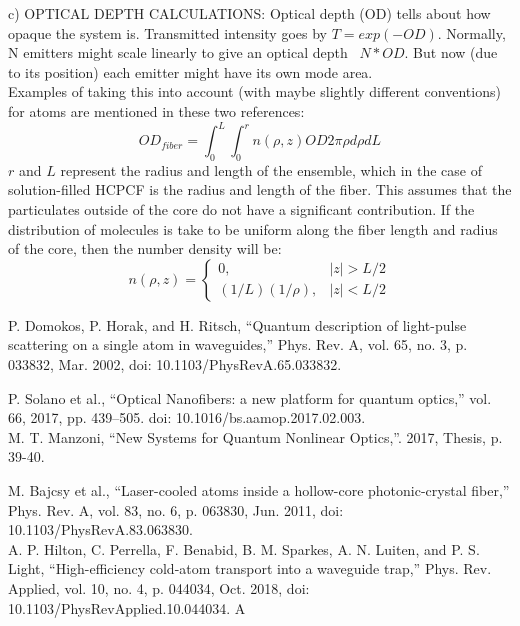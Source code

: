 c) OPTICAL DEPTH CALCULATIONS: Optical depth (OD) tells about how opaque the system is. Transmitted intensity goes by $T = exp(-OD)$. Normally, N emitters might scale linearly to give an optical depth ~$N*OD$. But now (due to its position) each emitter might have its own mode area.\\

Examples of taking this into account (with maybe slightly different conventions) for atoms are mentioned in these two references\cite{bajcsy, hilton}: 
\begin{equation}
	OD_{fiber} = \int^L_0 \int^{r}_0 n(\rho, z) OD 2\pi \rho d\rho dL
\end{equation}
$r$ and $L$ represent the radius and length of the ensemble, which in the case of solution-filled HCPCF is the radius and length of the fiber. This assumes that the particulates outside of the core do not have a significant contribution.  If the distribution of molecules is take to be uniform along the fiber length and radius of the core, then the number density will be: 
\begin{equation}
	n(\rho, z) = \begin{cases}
		0, &|z| > L/2\\
		(1/L) (1/\rho), &|z| < L/2
	\end{cases}
\end{equation}

\begin{thebibliography}{mode}
	 P. Domokos, P. Horak, and H. Ritsch, “Quantum description of light-pulse scattering on a single atom in waveguides,” Phys. Rev. A, vol. 65, no. 3, p. 033832, Mar. 2002, doi: 10.1103/PhysRevA.65.033832.
	
	 P. Solano et al., “Optical Nanofibers: a new platform for quantum optics,” vol. 66, 2017, pp. 439–505. doi: 10.1016/bs.aamop.2017.02.003.\\
	
	 M. T. Manzoni, “New Systems for Quantum Nonlinear Optics,”. 2017, Thesis, p. 39-40.
	
	 M. Bajcsy et al., “Laser-cooled atoms inside a hollow-core photonic-crystal fiber,” Phys. Rev. A, vol. 83, no. 6, p. 063830, Jun. 2011, doi: 10.1103/PhysRevA.83.063830. \\
	 A. P. Hilton, C. Perrella, F. Benabid, B. M. Sparkes, A. N. Luiten, and P. S. Light, “High-efficiency cold-atom transport into a waveguide trap,” Phys. Rev. Applied, vol. 10, no. 4, p. 044034, Oct. 2018, doi: 10.1103/PhysRevApplied.10.044034. A
\end{thebibliography}